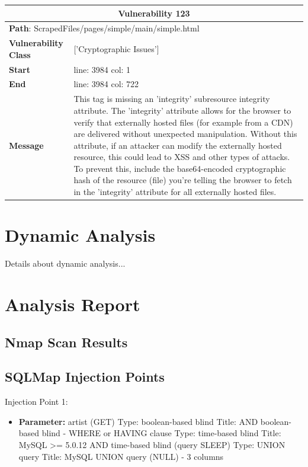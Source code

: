 \documentclass[12pt]{article}
\begin{document}
\vspace{0.7cm}
\FloatBarrier
\begin{table}[!h]
\centering
\renewcommand{\arraystretch}{1.3}
\begin{tabular}{|l|p{10cm}|}
\hline
\multicolumn{2}{|c|}{\textbf{Vulnerability 123}} \\
\hline
\multicolumn{2}{|l|}{\textbf{Path}: ScrapedFiles/pages/simple/main/simple.html} \\
\hline
\textbf{Vulnerability Class} & ['Cryptographic Issues'] \\
\hline
\textbf{Start} & line: 3984 \quad col: 1 \\
\hline
\textbf{End} & line: 3984 \quad col: 722 \\
\hline
\textbf{Message} & This tag is missing an 'integrity' subresource integrity attribute. The 'integrity' attribute allows for the browser to verify that externally hosted files (for example from a CDN) are delivered without unexpected manipulation. Without this attribute, if an attacker can modify the externally hosted resource, this could lead to XSS and other types of attacks. To prevent this, include the base64-encoded cryptographic hash of the resource (file) you're telling the browser to fetch in the 'integrity' attribute for all externally hosted files. \\
\hline
\end{tabular}
\end{table}
\vspace{0.7cm}
\FloatBarrier


\newpage
\section{Dynamic Analysis}
Details about dynamic analysis...

\section{Analysis Report}

\subsection{Nmap Scan Results}

\subsection*{SQLMap Injection Points}
Injection Point 1:
\begin{itemize}
    \item \textbf{Parameter:} artist (GET)
        \subitem Type: boolean-based blind
        \subitem Title: AND boolean-based blind - WHERE or HAVING clause
        \subitem 
        \subitem Type: time-based blind
        \subitem Title: MySQL >= 5.0.12 AND time-based blind (query SLEEP)
        \subitem 
        \subitem Type: UNION query
        \subitem Title: MySQL UNION query (NULL) - 3 columns
\end{itemize}
\end{document}
